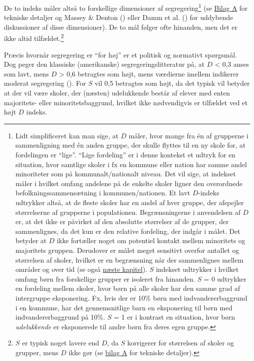 \documentclass[
]{book}
\begin{document}
De to indeks måler altså to forskellige dimensioner af segregering\footnote{Lidt simplificeret kan man sige, at \(D\) måler, hvor mange fra én af grupperne i sammenligning med én anden gruppe, der skulle flyttes til en ny skole for, at fordelingen er ``lige''. ``Lige fordeling'' er i denne kontekst et udtryk for en situation, hvor samtlige skoler i fx en kommune eller nation har samme andel minoriteter som på kommunalt/nationalt niveau. Det vil sige, at indekset måler i hvilket omfang andelene på de enkelte skoler ligner den overordnede befolkningssammensætning i kommunen/nationen. Et lavt \(D\)-indeks udtrykker altså, at de fleste skoler har en andel af hver gruppe, der afspejler størrelserne af grupperne i populationen. Begrænsningerne i anvendelsen af \(D\) er, at det ikke er påvirket af den absolutte størrelser af de grupper, der sammenlignes, da det kun er den relative fordeling, der indgår i målet. Det betyder at \(D\) ikke fortæller noget om potentiel kontakt mellem minoritets og majoritets gruppen. Derudover er målet meget sensitivt overfor antallet og størrelsen af skoler, hvilket er en begrænsning når der sammenlignes mellem områder og over tid (se også \hyperref[kap5]{næste kapitel}).
  \(S\) indekset udtrykker i hvilket omfang børn fra forskellige grupper er isoleret fra hinanden. \(S\) = 0 udtrykker en fordeling mellem skoler, hvor børn på alle skoler har den samme grad af intergruppe eksponering. Fx, hvis der er 10\% børn med indvandererbaggrund i en kommune, har det gennemsnitlige barn en eksponering til børn med indvandererbaggrund på 10\%. \(S\) = 1 er i kontrast en situation, hvor børn \emph{udelukkende} er eksponerede til andre børn fra deres egen gruppe.} (se \hyperref[ux5cux2520bilag1]{Bilag A} for tekniske detaljer og Massey \& Denton () eller Damm et al. () for uddybende diskussioner af disse dimensioner). De to mål følger ofte hinanden, men det er ikke altid tilfældet.\footnote{\(S\) er typisk noget lavere end \(D\), da \(S\) korrigerer for størrelsen af skoler og grupper, mens \(D\) ikke gør (se \hyperref[bilag1]{bilag A} for tekniske detaljer).}

Præcis hvornår segregering er ``for høj'' er et politisk og normativt spørgsmål. Dog peger den klassiske (amerikanske) segregeringslitteratur på, at \(D\) \textless{} 0,3 anses som lavt, mens \(D\) \textgreater{} 0,6 betragtes som højt, mens værdierne imellem indikerer moderat segregering (). For \(S\) vil 0,5 betragtes som højt, da det typisk vil betyder at der vil være skoler, der (næsten) udelukkende består af elever med enten majoritets- eller minoritetsbaggrund, hvilket ikke nødvendigvis er tilfældet ved et højt \(D\) indeks.
\end{document}
